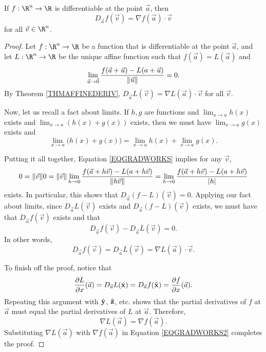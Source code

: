 \begin{theorem}
	\label{THMDIFFERENTIABLE}
	If $f:\R^n\to\R$ is differentiable at the point $\vec a$, then
	\[
		D_{\vec a}f(\vec v)=\nabla f(\vec a)\cdot \vec v
	\]
	for all $\vec v\in\R^n$.
\end{theorem}
\begin{proof}
	Let $f:\R^n\to\R$ be a function that is differentiable at
	the point $\vec a$, and let $L:\R^n\to\R$ be the unique affine function
	such that $f(\vec a)=L(\vec a)$ and 
	\begin{equation}
		\label{EQGRADWORKS}
		\lim_{\vec u\to\vec 0}
		\frac{f(\vec a+\vec u)-L(a+\vec u)}{\lVert\vec u\rVert}=0.
	\end{equation}
	By Theorem \ref{THMAFFINEDERIV}, $D_{\vec a}L(\vec v)=\nabla L(\vec a)\cdot \vec v$
	for all $\vec v$.

	Now, let us recall a fact about limits. If $h,g$ are functions and
	$\lim_{x\to a}h(x)$ exists and $\lim_{x\to a}(h(x)+g(x))$ exists, then
	we must have $\lim_{x\to a}g(x)$ exists and
	\[
		\lim_{x\to a} \Big(h(x)+g(x)\Big)=
		\lim_{x\to a} h(x)+\lim_{x\to a}g(x).
	\]
	
	Putting it all together, Equation \eqref{EQGRADWORKS} implies
	for any $\vec v$,
	\[
		0=\lVert\vec v\rVert0=\lVert\vec v\rVert\lim_{h\to 0} 
		\frac{f(\vec a+h\vec v)-L(a+h\vec v)}{\lVert h\vec v\rVert}
		=
		\lim_{h\to 0} 
		\frac{f(\vec a+h\vec v)-L(a+h\vec v)}{\lvert h\rvert}
	\]
	exists.  In particular, this shows that $D_{\vec a}(f-L)(\vec v)=0$.
	Applying our fact about limits, since $D_{\vec a}L(\vec v)$ exists
	and $D_{\vec a}(f-L)(\vec v)$ exists, we must have that $D_{\vec a}f(\vec v)$
	exists and that
	\[
		D_{\vec a}f(\vec v) - D_{\vec a}L(\vec v)=0.
	\]
	In other words,
	\begin{equation}
		\label{EQGRADWORKS2}
		D_{\vec a}f(\vec v) = D_{\vec a}L(\vec v) = \nabla L(\vec a)\cdot \vec v.
	\end{equation}

	To finish off the proof, notice that
	\[
		\frac{\partial L}{\partial x}(\vec a)=
		D_{\vec a}L({\hat {\mathbf x}}) = D_{\vec a}f({\hat {\mathbf x}})=\frac{\partial f}{\partial x}(\vec a).
	\]
	Repeating this argument with ${\hat {\mathbf y}}$,
	${\hat {\mathbf z}}$, etc\mbox{.} shows that the partial derivatives of $f$ at $\vec a$
	must equal the partial derivatives of $L$ at $\vec a$.  Therefore,
	\[
		\nabla L(\vec a)=\nabla f(\vec a).
	\]
	Substituting $\nabla L(\vec a)$ with $\nabla f(\vec a)$ in Equation
	\eqref{EQGRADWORKS2} completes the proof.
\end{proof}

